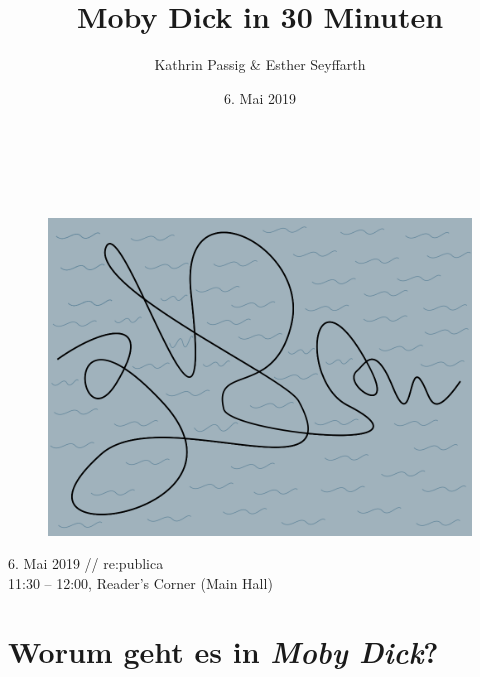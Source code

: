 \documentclass[a5paper,9pt,twoside=false]{extbook}
\title{Moby Dick in 30 Minuten}
\author{Kathrin Passig \& Esther Seyffarth}
\date{6. Mai 2019}
\begin{document}
\begin{titlepage}

\vspace{3em}
		\\
			
		\vspace{10mm}
		\\
		
		\vspace{1.5cm}
	
		
\begin{figure}[h]       
{ \centering
\includegraphics[width=\textwidth]{plot_curve_water.png} \\
}

\end{figure}
		
		\vspace{\fill}
		\centering \large{6. Mai 2019 // re:publica \\11:30 -- 12:00, Reader's Corner (Main Hall)}
\end{titlepage}


\newpage

\section*{Worum geht es in \textit{Moby Dick}?}\label{interpretationen}
\end{document}

